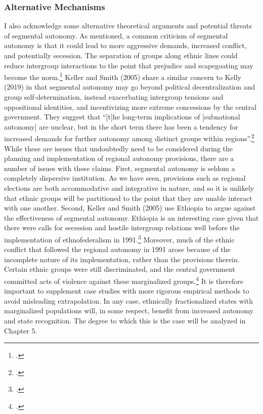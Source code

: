 \documentclass[12pt]{article}
\begin{document}
\subsubsection{Alternative Mechanisms}
I also acknowledge some alternative theoretical arguments and potential threats of segmental autonomy. As mentioned, a common criticism of segmental autonomy is that it could lead to more aggressive demands, increased conflict, and potentially secession. The separation of groups along ethnic lines could reduce intergroup interactions to the point that prejudice and scapegoating may become the norm.\footcite{kelly_power-sharing_2019} Keller and Smith (2005) share a similar concern to Kelly (2019) in that segmental autonomy may go beyond political decentralization and group self-determination, instead exacerbating intergroup tensions and oppositional identities, and incentivizing more extreme concessions by the central government. They suggest that ``[t]he long-term implications of [subnational autonomy] are unclear, but in the short term there has been a tendency for increased demands for further autonomy among distinct groups within regions''.\footcite[240]{keller_obstacle_2005} While these are issues that undoubtedly need to be considered during the planning and implementation of regional autonomy provisions, there are a number of issues with these claims. First, segmental autonomy is seldom a completely dispersive institution. As we have seen, provisions such as regional elections are both accommodative and integrative in nature, and so it is unlikely that ethnic groups will be partitioned to the point that they are unable interact with one another. Second, Keller and Smith (2005) use Ethiopia to argue against the effectiveness of segmental autonomy. Ethiopia is an interesting case given that there were calls for secession and hostile intergroup relations well before the implementation of ethnofederalism in 1991.\footcite{vogt_integrating_2015} Moreover, much of the ethnic conflict that followed the regional autonomy in 1991 arose because of the incomplete nature of its implementation, rather than the provisions therein. Certain ethnic groups were still discriminated, and the central government committed acts of violence against these marginalized groups.\footcite{vogt_integrating_2015} It is therefore important to supplement case studies with more rigorous empirical methods to avoid misleading extrapolation. In any case, ethnically fractionalized states with marginalized populations will, in some respect, benefit from increased autonomy and state recognition. The degree to which this is the case will be analyzed in Chapter 5.
\end{document}
